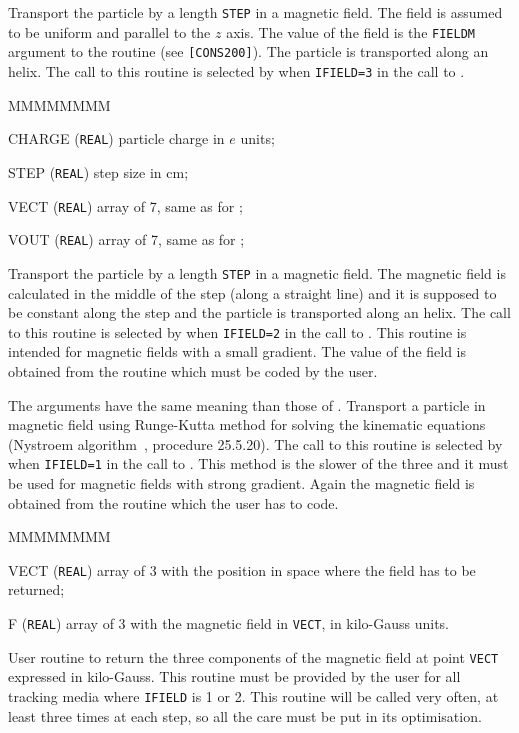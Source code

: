 Transport the particle by a length {\tt STEP} in a magnetic
field. The field is assumed to be uniform and parallel to the
$z$ axis. The value of the field is the {\tt FIELDM} argument to
the  routine (see {\tt [CONS200]}). The particle is
transported along an helix.  The call to this routine is selected by 
 when {\tt IFIELD=3} in the call to .


\begin{DLtt}{MMMMMMMM}
\item[CHARGE] ({\tt REAL}) particle charge in $e$ units;
\item[STEP] ({\tt REAL}) step size in cm;
\item[VECT] ({\tt REAL}) array of 7, same as for ;
\item[VOUT] ({\tt REAL}) array of 7, same as for ;
\end{DLtt}
 
Transport the particle by a length {\tt STEP} in a magnetic
field. The magnetic field is calculated in the middle of the step
(along a straight line) and it is supposed to be constant along
the step and the particle is transported along an helix. 
The call to this routine is selected by
 when {\tt IFIELD=2} in the call to .
This routine is intended for magnetic fields with a small gradient.
The value of the field is obtained from the routine 
which must be coded by the user.

 
The arguments have the same meaning than those of
. Transport a particle in magnetic field using
Runge-Kutta method for solving the kinematic equations (Nystroem 
algorithm~\cite{bib-NATB}, procedure 25.5.20).
The call to this routine is selected by
 when {\tt IFIELD=1} in the call to .
This method is the slower of the three and it must be used for
magnetic fields with strong gradient. Again the magnetic field is
obtained from the  routine which the user has to code.


\begin{DLtt}{MMMMMMMM}
\item[VECT] ({\tt REAL}) array of 3 with the position in space where the
field has to be returned;
\item[F] ({\tt REAL}) array of 3 with the magnetic field in {\tt VECT},
in kilo-Gauss units.
\end{DLtt}

User routine to return the three components of the magnetic field at
point {\tt VECT} expressed in kilo-Gauss. This routine must be provided
by the user for all tracking media where {\tt IFIELD} is 1 or 2. This
routine will be called very often, at least three times at each step,
so all the care must be put in its optimisation.
